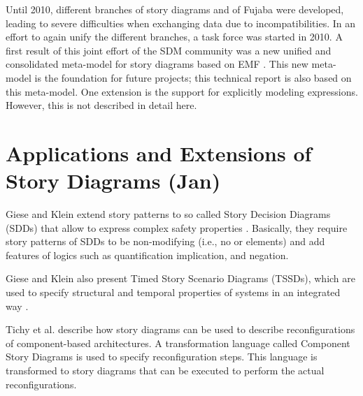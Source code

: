 Until 2010, different branches of story diagrams and of Fujaba were developed, leading to severe difficulties when exchanging data due to incompatibilities.
In an effort to again unify the different branches, a task force was started in 2010.
A first result of this joint effort of the SDM community was a new unified and consolidated meta-model for story diagrams based on EMF \cite{HRvD+11}.
This new meta-model is the foundation for future projects; this technical report is also based on this meta-model.
One extension is the support for explicitly modeling expressions.
However, this is not described in detail here.













\section{Applications and Extensions of Story Diagrams (Jan)}
Giese and Klein extend story patterns to so called Story Decision Diagrams (SDDs) that allow to express complex safety properties \cite{GK06a}.
Basically, they require story patterns of SDDs to be non-modifying (i.e., no \create or \destroy elements) and add features of logics such as quantification implication, and negation.

Giese and Klein also present Timed Story Scenario Diagrams (TSSDs), which are used to specify structural and temporal properties of systems in an integrated way \cite{KG07a}.

Tichy et al. \cite{THH+08} describe how story diagrams can be used to describe reconfigurations of component-based architectures.
A transformation language called Component Story Diagrams is used to specify reconfiguration steps.
This language is transformed to story diagrams that can be executed to perform the actual reconfigurations.

